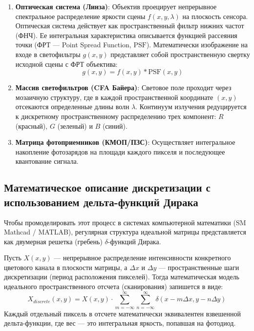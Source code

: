 \documentclass[12pt,a4paper]{article}
\begin{document}
\begin{enumerate}
    \item \textbf{Оптическая система (Линза)}: Объектив проецирует непрерывное спектральное распределение яркости сцены $f(x, y, \lambda)$ на плоскость сенсора. Оптическая система действует как пространственный фильтр нижних частот (ФНЧ). Ее интегральная характеристика описывается функцией рассеяния точки (ФРТ --- Point Spread Function, $\text{PSF}$). Математически изображение на входе в светофильтры $g(x,y)$ представляет собой пространственную свертку исходной сцены с ФРТ объектива:
    \begin{equation}
        g(x, y) = f(x, y) * \text{PSF}(x, y)
    \end{equation}
    
    \item \textbf{Массив светофильтров (CFA Байера)}: Световое поле проходит через мозаичную структуру, где в каждой пространственной координате $(x,y)$ отсекаются определенные длины волн $\lambda$. Континуум излучения редуцируется к дискретному пространственному распределению трех компонент: $R$ (красный), $G$ (зеленый) и $B$ (синий).
    
    \item \textbf{Матрица фотоприемников (КМОП/ПЗС)}: Осуществляет интегральное накопление фотозарядов на площади каждого пикселя и последующее квантование сигнала.
\end{enumerate}

\subsection{Математическое описание дискретизации с использованием дельта-функций Дирака}
Чтобы промоделировать этот процесс в системах компьютерной математики (SM Mathcad / MATLAB), регулярная структура идеальной матрицы представляется как двумерная решетка (гребень) $\delta$-функций Дирака. 

Пусть $X(x, y)$ --- непрерывное распределение интенсивности конкретного цветового канала в плоскости матрицы, а $\Delta x$ и $\Delta y$ --- пространственные шаги дискретизации (период расположения пикселей). Тогда математическая модель идеального пространственного отсчета (сканирования) запишется в виде:
\begin{equation}
    X_{discrete}(x, y) = X(x, y) \cdot \sum_{m=-\infty}^{\infty} \sum_{n=-\infty}^{\infty} \delta(x - m\Delta x, y - n\Delta y)
\end{equation}
Каждый отдельный пиксель в отсчете математически эквивалентен взвешенной дельта-функции, где вес --- это интегральная яркость, попавшая на фотодиод.
\end{document}
